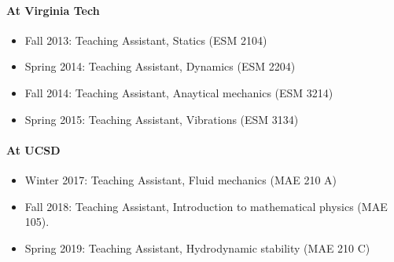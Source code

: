 \documentclass[10pt]{res} %
\begin{document}
\begin{resume}
\paragraph{At Virginia Tech} 
\begin{itemize}
	\vspace*{2mm}
	\item Fall 2013: Teaching Assistant, Statics  (ESM 2104)
	\item Spring 2014: Teaching Assistant, Dynamics (ESM 2204)
	\item Fall 2014: Teaching Assistant, Anaytical mechanics (ESM 3214)
	\item Spring 2015: Teaching Assistant, Vibrations (ESM 3134)
\end{itemize}

\paragraph{At UCSD} 
\begin{itemize}
    \vspace*{2mm}
	\item Winter 2017: Teaching Assistant, Fluid mechanics (MAE 210 A)
	\item Fall   2018: Teaching Assistant, Introduction to mathematical physics (MAE 105).
	\item Spring 2019: Teaching Assistant, Hydrodynamic stability (MAE 210 C)
\end{itemize}

\vspace*{0.1 in}







\end{resume}
\end{document}
